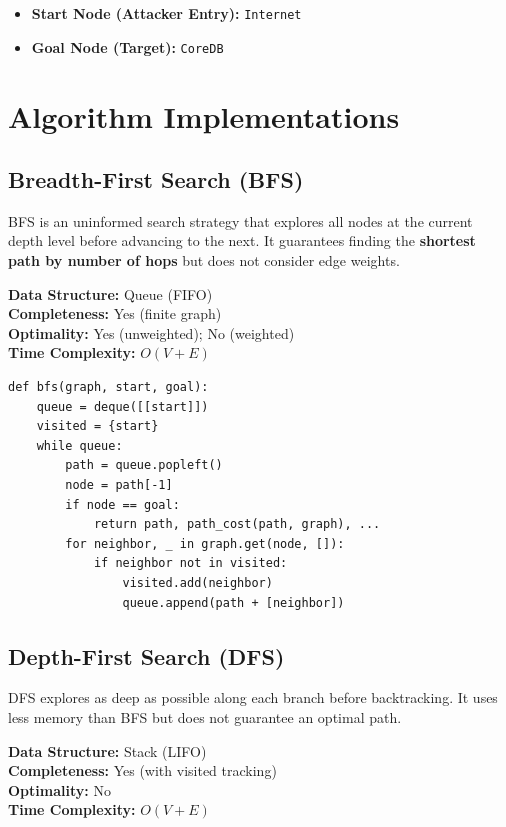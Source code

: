 \documentclass[12pt,a4paper]{article}
\begin{document}
\begin{itemize}
    \item \textbf{Start Node (Attacker Entry):} \texttt{Internet}
    \item \textbf{Goal Node (Target):} \texttt{CoreDB}
\end{itemize}

\section{Algorithm Implementations}

\subsection{Breadth-First Search (BFS)}

BFS is an uninformed search strategy that explores all nodes at the current depth level
before advancing to the next. It guarantees finding the \textbf{shortest path by number
of hops} but does not consider edge weights.

\textbf{Data Structure:} Queue (FIFO)\\
\textbf{Completeness:} Yes (finite graph)\\
\textbf{Optimality:} Yes (unweighted); No (weighted)\\
\textbf{Time Complexity:} $O(V + E)$

\begin{lstlisting}[style=pythonstyle, caption={BFS Core Logic}]
def bfs(graph, start, goal):
    queue = deque([[start]])
    visited = {start}
    while queue:
        path = queue.popleft()
        node = path[-1]
        if node == goal:
            return path, path_cost(path, graph), ...
        for neighbor, _ in graph.get(node, []):
            if neighbor not in visited:
                visited.add(neighbor)
                queue.append(path + [neighbor])
\end{lstlisting}

\subsection{Depth-First Search (DFS)}

DFS explores as deep as possible along each branch before backtracking. It uses less
memory than BFS but does not guarantee an optimal path.

\textbf{Data Structure:} Stack (LIFO)\\
\textbf{Completeness:} Yes (with visited tracking)\\
\textbf{Optimality:} No\\
\textbf{Time Complexity:} $O(V + E)$
\end{document}
